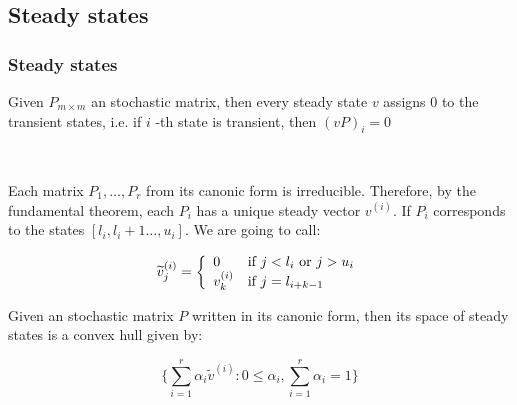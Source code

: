 \subsection{Steady states}
 \begin{frame}\frametitle{Steady states}
    \vspace{2em}
    \begin{proposition}
    Given \(P_{m\times m}\) an stochastic matrix, then every steady state \(v\) assigns 
    \(0\) to the transient states, i.e. if \(i\) -th state is transient, then 
    \((vP)_i = 0\)
    
    ~\\
    \label{prop:ss-transient-zero}
    \end{proposition}
    Each matrix \(P_1, \ldots, P_r\) from its canonic form is irreducible. Therefore, 
    by the fundamental theorem, each \(P_i\) has a unique steady vector \(v^{(i)}\). 
    If \(P_i\) corresponds to the states \([l_i, l_i + 1 \ldots, u_i]\). We are going 
    to call:
    
    \[
    \widetilde{v}^{(i)}_j = \left\{\begin{array}{ll} 0 & \textrm{if } j < l_i \textrm{ or } j > u_i \\ v^{(i)}_k & \textrm{if } j = l_{i + k - 1} \end{array}\right.
    \]

    \begin{proposition}
    Given an stochastic matrix \(P\) written in its canonic form, then its space of 
    steady states is a convex hull given by:

    \[
    \bigg\{\sum_{i = 1}^r \alpha_i \widetilde{v}^{(i)}: 0 \le \alpha_i, \sum_{i = 1}^{r} \alpha_i = 1\bigg\}
    \]
    \end{proposition}
\end{frame}
